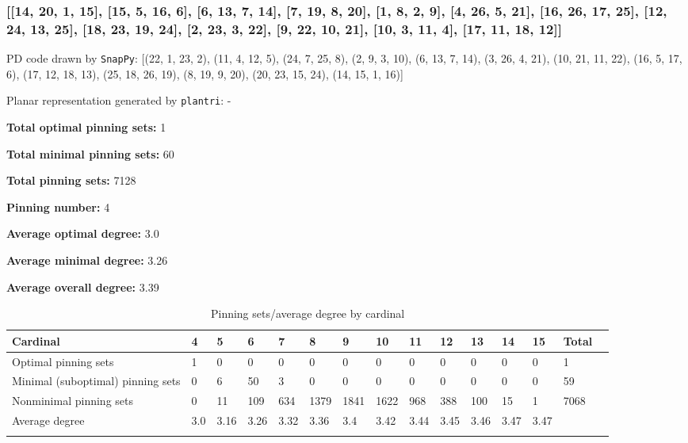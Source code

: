 \documentclass{article}%
\begin{document}
\newpage

\subsubsection{[[14, 20, 1, 15], [15, 5, 16, 6], [6, 13, 7, 14], [7, 19, 8, 20], [1, 8, 2, 9], [4, 26, 5, 21], [16, 26, 17, 25], [12, 24, 13, 25], [18, 23, 19, 24], [2, 23, 3, 22], [9, 22, 10, 21], [10, 3, 11, 4], [17, 11, 18, 12]]}

{\small\noindent PD code drawn by \texttt{SnapPy}: [(22, 1, 23, 2), (11, 4, 12, 5), (24, 7, 25, 8), (2, 9, 3, 10), (6, 13, 7, 14), (3, 26, 4, 21), (10, 21, 11, 22), (16, 5, 17, 6), (17, 12, 18, 13), (25, 18, 26, 19), (8, 19, 9, 20), (20, 23, 15, 24), (14, 15, 1, 16)]}

{\small\noindent Planar representation generated by \texttt{plantri}: -}

\begin{multicols}{2}
{\normalsize \noindent\textbf{Total optimal pinning sets:} 1

\noindent\textbf{Total minimal pinning sets:} 60

\noindent\textbf{Total pinning sets:} 7128

\noindent\textbf{Pinning number:} 4

}
\columnbreak

{\normalsize \noindent\textbf{Average optimal degree:} 3.0

\noindent\textbf{Average minimal degree:} 3.26

\noindent\textbf{Average overall degree:} 3.39

}
\end{multicols}

\begin{table}[ht]
	\caption{Pinning sets/average degree by cardinal}
	\centering
	\renewcommand{\arraystretch}{1.5}
	\begin{tabularx}{\textwidth}{lXXXXXXXXXXXXXX}
		\toprule
			Cardinal & 4 & 5 & 6 & 7 & 8 & 9 & 10 & 11 & 12 & 13 & 14 & 15 & Total\\
			\hline
			Optimal pinning sets & 1 & 0 & 0 & 0 & 0 & 0 & 0 & 0 & 0 & 0 & 0 & 0 & 1 \\
			Minimal (suboptimal) pinning sets & 0 & 6 & 50 & 3 & 0 & 0 & 0 & 0 & 0 & 0 & 0 & 0 & 59 \\
			Nonminimal pinning sets & 0 & 11 & 109 & 634 & 1379 & 1841 & 1622 & 968 & 388 & 100 & 15 & 1 & 7068 \\
			Average degree & 3.0 & 3.16 & 3.26 & 3.32 & 3.36 & 3.4 & 3.42 & 3.44 & 3.45 & 3.46 & 3.47 & 3.47 &  \\
		\bottomrule \\ 
	\end{tabularx}
\end{table}
\end{document}
